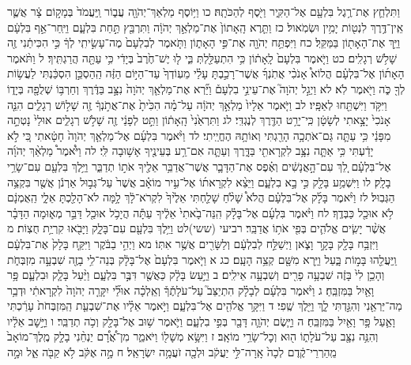 \documentclass[twoside, openany, parskip=half, 11pt]{book}
\begin{document}
וַתִּלְחַ֛ץ אֶת־רֶ֥גֶל בִּלְעָ֖ם אֶל־הַקִּ֑יר וַיֹּ֖סֶף לְהַכֹּתָֽהּ׃ כו וַיּ֥וֹסֶף מַלְאַךְ־יְהֹוָ֖ה עֲב֑וֹר וַֽיַּעֲמֹד֙ בְּמָק֣וֹם צָ֔ר אֲשֶׁ֛ר אֵֽין־דֶּ֥רֶךְ לִנְט֖וֹת יָמִ֥ין וּשְׂמֹֽאול׃ כז וַתֵּ֤רֶא הָֽאָתוֹן֙ אֶת־מַלְאַ֣ךְ יְהֹוָ֔ה וַתִּרְבַּ֖ץ תַּ֣חַת בִּלְעָ֑ם וַיִּֽחַר־אַ֣ף בִּלְעָ֔ם וַיַּ֥ךְ אֶת־הָאָת֖וֹן בַּמַּקֵּֽל׃ כח וַיִּפְתַּ֥ח יְהֹוָ֖ה אֶת־פִּ֣י הָאָת֑וֹן וַתֹּ֤אמֶר לְבִלְעָם֙ מֶה־עָשִׂ֣יתִֽי לְךָ֔ כִּ֣י הִכִּיתַ֔נִי זֶ֖ה שָׁלֹ֥שׁ רְגָלִֽים׃ כט וַיֹּ֤אמֶר בִּלְעָם֙ לָֽאָת֔וֹן כִּ֥י הִתְעַלַּ֖לְתְּ בִּ֑י ל֤וּ יֶשׁ־חֶ֙רֶב֙ בְּיָדִ֔י כִּ֥י עַתָּ֖ה הֲרַגְתִּֽיךְ׃ ל וַתֹּ֨אמֶר הָאָת֜וֹן אֶל־בִּלְעָ֗ם הֲלוֹא֩ אָנֹכִ֨י אֲתֹֽנְךָ֜ אֲשֶׁר־רָכַ֣בְתָּ עָלַ֗י מֵעֽוֹדְךָ֙ עַד־הַיּ֣וֹם הַזֶּ֔ה הַֽהַסְכֵּ֣ן הִסְכַּ֔נְתִּי לַעֲשׂ֥וֹת לְךָ֖ כֹּ֑ה וַיֹּ֖אמֶר לֹֽא׃ לא וַיְגַ֣ל יְהֹוָה֮ אֶת־עֵינֵ֣י בִלְעָם֒ וַיַּ֞רְא אֶת־מַלְאַ֤ךְ יְהֹוָה֙ נִצָּ֣ב בַּדֶּ֔רֶךְ וְחַרְבּ֥וֹ שְׁלֻפָ֖ה בְּיָד֑וֹ וַיִּקֹּ֥ד וַיִּשְׁתַּ֖חוּ לְאַפָּֽיו׃ לב וַיֹּ֤אמֶר אֵלָיו֙ מַלְאַ֣ךְ יְהֹוָ֔ה עַל־מָ֗ה הִכִּ֙יתָ֙ אֶת־אֲתֹ֣נְךָ֔ זֶ֖ה שָׁל֣וֹשׁ רְגָלִ֑ים הִנֵּ֤ה אָנֹכִי֙ יָצָ֣אתִי לְשָׂטָ֔ן כִּֽי־יָרַ֥ט הַדֶּ֖רֶךְ לְנֶגְדִּֽי׃ לג וַתִּרְאַ֙נִי֙ הָֽאָת֔וֹן וַתֵּ֣ט לְפָנַ֔י זֶ֖ה שָׁלֹ֣שׁ רְגָלִ֑ים אוּלַי֙ נָטְתָ֣ה מִפָּנַ֔י כִּ֥י עַתָּ֛ה גַּם־אֹתְכָ֥ה הָרַ֖גְתִּי וְאוֹתָ֥הּ הֶחֱיֵֽיתִי׃ לד וַיֹּ֨אמֶר בִּלְעָ֜ם אֶל־מַלְאַ֤ךְ יְהֹוָה֙ חָטָ֔אתִי כִּ֚י לֹ֣א יָדַ֔עְתִּי כִּ֥י אַתָּ֛ה נִצָּ֥ב לִקְרָאתִ֖י בַּדָּ֑רֶךְ וְעַתָּ֛ה אִם־רַ֥ע בְּעֵינֶ֖יךָ אָשׁ֥וּבָה לִּֽי׃ לה וַיֹּ֩אמֶר֩ מַלְאַ֨ךְ יְהֹוָ֜ה אֶל־בִּלְעָ֗ם לֵ֚ךְ עִם־הָ֣אֲנָשִׁ֔ים וְאֶ֗פֶס אֶת־הַדָּבָ֛ר אֲשֶׁר־אֲדַבֵּ֥ר אֵלֶ֖יךָ אֹת֣וֹ תְדַבֵּ֑ר וַיֵּ֥לֶךְ בִּלְעָ֖ם עִם־שָׂרֵ֥י בָלָֽק׃ לו וַיִּשְׁמַ֥ע בָּלָ֖ק כִּ֣י בָ֣א בִלְעָ֑ם וַיֵּצֵ֨א לִקְרָאת֜וֹ אֶל־עִ֣יר מוֹאָ֗ב אֲשֶׁר֙ עַל־גְּב֣וּל אַרְנֹ֔ן אֲשֶׁ֖ר בִּקְצֵ֥ה הַגְּבֽוּל׃ לז וַיֹּ֨אמֶר בָּלָ֜ק אֶל־בִּלְעָ֗ם הֲלֹא֩ שָׁלֹ֨חַ שָׁלַ֤חְתִּי אֵלֶ֙יךָ֙ לִקְרֹא־לָ֔ךְ לָ֥מָּה לֹא־הָלַ֖כְתָּ אֵלָ֑י הַֽאֻמְנָ֔ם לֹ֥א אוּכַ֖ל כַּבְּדֶֽךָ׃ לח וַיֹּ֨אמֶר בִּלְעָ֜ם אֶל־בָּלָ֗ק הִֽנֵּה־בָ֙אתִי֙ אֵלֶ֔יךָ עַתָּ֕ה הֲיָכֹ֥ל אוּכַ֖ל דַּבֵּ֣ר מְא֑וּמָה הַדָּבָ֗ר אֲשֶׁ֨ר יָשִׂ֧ים אֱלֹהִ֛ים בְּפִ֖י אֹת֥וֹ אֲדַבֵּֽר׃ רביעי (ששי)לט וַיֵּ֥לֶךְ בִּלְעָ֖ם עִם־בָּלָ֑ק וַיָּבֹ֖אוּ קִרְיַ֥ת חֻצֽוֹת׃ מ וַיִּזְבַּ֥ח בָּלָ֖ק בָּקָ֣ר וָצֹ֑אן וַיְשַׁלַּ֣ח לְבִלְעָ֔ם וְלַשָּׂרִ֖ים אֲשֶׁ֥ר אִתּֽוֹ׃ מא וַיְהִ֣י בַבֹּ֔קֶר וַיִּקַּ֤ח בָּלָק֙ אֶת־בִּלְעָ֔ם וַֽיַּעֲלֵ֖הוּ בָּמ֣וֹת בָּ֑עַל וַיַּ֥רְא מִשָּׁ֖ם קְצֵ֥ה הָעָֽם׃ כג א וַיֹּ֤אמֶר בִּלְעָם֙ אֶל־בָּלָ֔ק בְּנֵה־לִ֥י בָזֶ֖ה שִׁבְעָ֣ה מִזְבְּחֹ֑ת וְהָכֵ֥ן לִי֙ בָּזֶ֔ה שִׁבְעָ֥ה פָרִ֖ים וְשִׁבְעָ֥ה אֵילִֽים׃ ב וַיַּ֣עַשׂ בָּלָ֔ק כַּאֲשֶׁ֖ר דִּבֶּ֣ר בִּלְעָ֑ם וַיַּ֨עַל בָּלָ֧ק וּבִלְעָ֛ם פָּ֥ר וָאַ֖יִל בַּמִּזְבֵּֽחַ׃ ג וַיֹּ֨אמֶר בִּלְעָ֜ם לְבָלָ֗ק הִתְיַצֵּב֮ עַל־עֹלָתֶ֒ךָ֒ וְאֵֽלְכָ֗ה אוּלַ֞י יִקָּרֵ֤ה יְהֹוָה֙ לִקְרָאתִ֔י וּדְבַ֥ר מַה־יַּרְאֵ֖נִי וְהִגַּ֣דְתִּי לָ֑ךְ וַיֵּ֖לֶךְ שֶֽׁפִי׃ ד וַיִּקָּ֥ר אֱלֹהִ֖ים אֶל־בִּלְעָ֑ם וַיֹּ֣אמֶר אֵלָ֗יו אֶת־שִׁבְעַ֤ת הַֽמִּזְבְּחֹת֙ עָרַ֔כְתִּי וָאַ֛עַל פָּ֥ר וָאַ֖יִל בַּמִּזְבֵּֽחַ׃ ה וַיָּ֧שֶׂם יְהֹוָ֛ה דָּבָ֖ר בְּפִ֣י בִלְעָ֑ם וַיֹּ֛אמֶר שׁ֥וּב אֶל־בָּלָ֖ק וְכֹ֥ה תְדַבֵּֽר׃ ו וַיָּ֣שׇׁב אֵלָ֔יו וְהִנֵּ֥ה נִצָּ֖ב עַל־עֹלָת֑וֹ ה֖וּא וְכׇל־שָׂרֵ֥י מוֹאָֽב׃ ז וַיִּשָּׂ֥א מְשָׁל֖וֹ וַיֹּאמַ֑ר מִן־אֲ֠רָ֠ם יַנְחֵ֨נִי בָלָ֤ק מֶֽלֶךְ־מוֹאָב֙ מֵֽהַרְרֵי־קֶ֔דֶם לְכָה֙ אָֽרָה־לִּ֣י יַעֲקֹ֔ב וּלְכָ֖ה זֹעֲמָ֥ה יִשְׂרָאֵֽל׃ ח מָ֣ה אֶקֹּ֔ב לֹ֥א קַבֹּ֖ה אֵ֑ל וּמָ֣ה 
\end{document}
